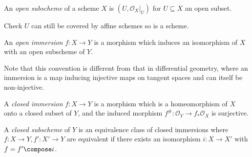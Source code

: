 \documentclass[a4paper]{article}
\newcommand{\sh}[1]{\mathcal{#1}} %
\begin{document}
\begin{definition}
  An \emph{open subscheme} of a scheme \(X\) is \((U, \sh O_X|_U)\) for \(U \subseteq X\) an open subset.
\end{definition}
Check \(U\) can still be covered by affine schemes so is a scheme.

\begin{definition}
  An \emph{open immersion} \(f: X \to Y\) is a morphism which induces an isomorphism of \(X\) with an open subscheme of \(Y\).
\end{definition}
Note that this convention is different from that in differential geometry, where an immersion is a map inducing injective maps on tangent spaces and can itself be non-injective.

\begin{definition}
  A \emph{closed immersion} \(f: X \to Y\) is a morphism which is a homeomorphism of \(X\) onto a closed subset of \(Y\), and the induced morphism \(f^\#: \sh O_Y \to f_* \sh O_X\) is surjective.
\end{definition}

\begin{definition}
  A \emph{closed subscheme} of \(Y\) is an equivalence class of closed immersions where \(f: X \to Y, f': X' \to Y\) are equivalent if there exists an isomorphism \(i: X \to X'\) with \(f = f' \compose i\).
\end{definition}
\end{document}
